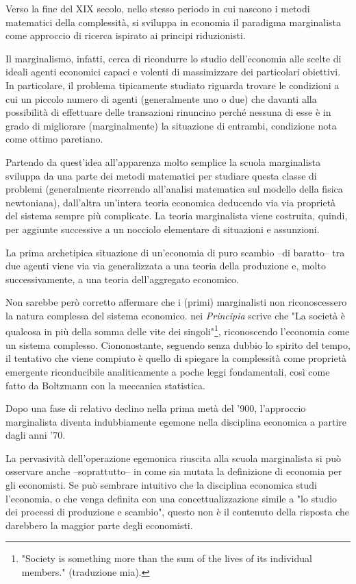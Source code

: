 \documentclass[a4paper, headings=standardclasses]{scrartcl}
\begin{document}
Verso la fine del XIX secolo, nello stesso periodo in cui nascono i metodi matematici
della complessità, si sviluppa in economia il paradigma marginalista come approccio di ricerca ispirato ai principi riduzionisti. 

Il marginalismo, infatti, cerca di ricondurre lo studio dell'economia alle scelte di ideali agenti economici capaci e volenti di massimizzare dei particolari obiettivi. 
In particolare, il problema tipicamente studiato riguarda trovare le condizioni a cui un piccolo numero di agenti (generalmente uno o due) che davanti alla possibilità di effettuare delle transazioni rinuncino perché nessuna di esse è in grado di migliorare (marginalmente) la situazione di entrambi, condizione nota come ottimo paretiano.

Partendo da quest'idea all'apparenza molto semplice la scuola marginalista sviluppa da una parte dei metodi matematici per studiare questa classe di problemi (generalmente ricorrendo all'analisi matematica sul modello della fisica newtoniana), dall'altra un'intera teoria economica deducendo via via proprietà del sistema sempre più complicate.
La teoria marginalista viene costruita, quindi, per aggiunte successive a un nocciolo elementare di situazioni e assunzioni.

La prima archetipica situazione di un'economia di puro scambio --di baratto-- tra due agenti viene via via generalizzata a una teoria della produzione e, molto successivamente, a una teoria dell'aggregato economico.

Non sarebbe però corretto affermare che i (primi) marginalisti non riconoscessero la natura complessa del sistema economico.
\textcite[p. 20]{marshall1988} nei \textit{Principia} scrive che "La società è qualcosa in più della somma delle vite dei singoli"\footnote{"Society is something more than the sum of the lives of its individual members." (traduzione mia).}, riconoscendo l'economia come un sistema complesso.
Ciononostante, seguendo senza dubbio lo spirito del tempo, il tentativo che viene compiuto è quello di spiegare la complessità come proprietà emergente riconducibile analiticamente a poche leggi fondamentali, così come fatto da Boltzmann con la meccanica statistica.

Dopo una fase di relativo declino nella prima metà del '900, l'approccio marginalista diventa indubbiamente egemone nella disciplina economica a partire dagli anni '70. 

La pervasività dell'operazione egemonica riuscita alla scuola marginalista si può osservare anche --soprattutto-- in come sia mutata la definizione di economia per gli economisti. 
Se può sembrare intuitivo che la disciplina economica studi l'economia, o che venga definita con una concettualizzazione simile a "lo studio dei processi di produzione e scambio", questo non è il contenuto della risposta che darebbero la maggior parte degli economisti.
\end{document}
